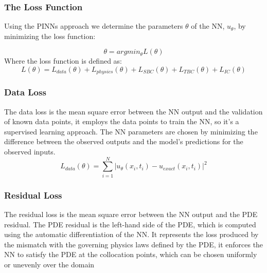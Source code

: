\documentclass{article}
\begin{document}



\subsubsection{The Loss Function}

Using the PINNs approach we determine the parameters $\theta$ of the NN, $u_\theta$, by minimizing the loss function:

$$
\theta = argmin_\theta L(\theta)
$$
Where the loss function is defined as:
$$
L(\theta) = L_{data}(\theta) + L_{physics}(\theta) + L_{SBC}(\theta) + L_{TBC}(\theta)+ L_{IC}(\theta)
$$

\subsubsection*{Data Loss}

The data loss is the mean square error between the NN output and the validation of known data points, it employs the data points to train the NN, so it's a supervised learning approach.
The NN parameters are chosen by minimizing the difference between the observed outputs and the model’s predictions for the observed inputs.
$$
L_{data}(\theta) = \sum_{i=1}^{N} |u_\theta(x_i,t_i) - u_{exact}(x_i,t_i)|^2
$$

\subsubsection*{Residual Loss}

The residual loss is the mean square error between the NN output and the PDE residual. The PDE residual is the left-hand side of the PDE, which is computed using the automatic differentiation of the NN.
It represents the loss produced by the mismatch with the governing physics laws defined by the PDE, it enforces the NN to satisfy the PDE at the collocation points, which can be chosen uniformly or unevenly over the domain
\end{document}
